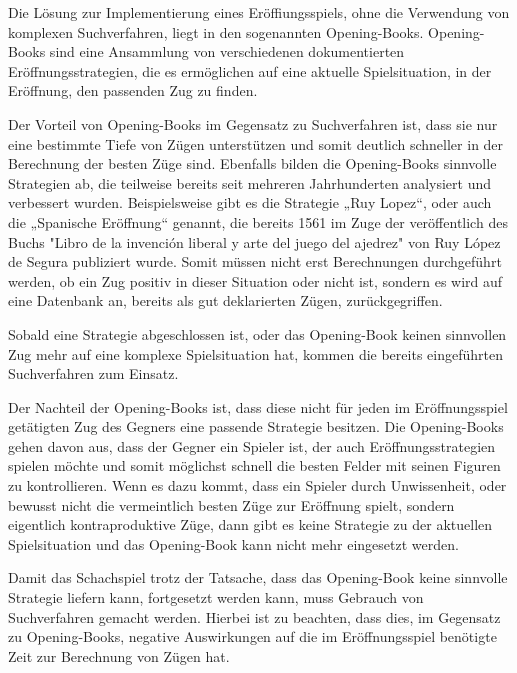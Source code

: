 
Die Lösung zur Implementierung eines Eröffiungsspiels, ohne die Verwendung von komplexen Suchverfahren, liegt in den sogenannten Opening-Books. Opening-Books sind eine Ansammlung von verschiedenen dokumentierten Eröffnungsstrategien, die es ermöglichen auf eine aktuelle Spielsituation, in der Eröffnung, den passenden Zug zu finden.

Der Vorteil von Opening-Books im Gegensatz zu Suchverfahren ist, dass sie nur eine bestimmte Tiefe von Zügen unterstützen und somit deutlich schneller in der Berechnung der besten Züge sind. Ebenfalls bilden die Opening-Books sinnvolle Strategien ab, die teilweise bereits seit mehreren Jahrhunderten analysiert und verbessert wurden. Beispielsweise gibt es die Strategie „Ruy Lopez“, oder auch die „Spanische Eröffnung“ genannt, die bereits 1561 im Zuge der veröffentlich des Buchs "Libro de la invención liberal y arte del juego del ajedrez" von Ruy López de Segura publiziert wurde. Somit müssen nicht erst Berechnungen durchgeführt werden, ob ein Zug positiv in dieser Situation oder nicht ist, sondern es wird auf eine Datenbank an, bereits als gut deklarierten Zügen, zurückgegriffen. 


Sobald eine Strategie abgeschlossen ist, oder das Opening-Book keinen sinnvollen Zug mehr auf eine komplexe Spielsituation hat, kommen die bereits eingeführten Suchverfahren zum Einsatz.

Der Nachteil der Opening-Books ist, dass diese nicht für jeden im Eröffnungsspiel getätigten Zug des Gegners eine passende Strategie besitzen. Die Opening-Books gehen davon aus, dass der Gegner ein Spieler ist, der auch Eröffnungsstrategien spielen möchte und somit möglichst schnell die besten Felder mit seinen Figuren zu kontrollieren. Wenn es dazu kommt, dass ein Spieler durch Unwissenheit, oder bewusst nicht die vermeintlich besten Züge zur Eröffnung spielt, sondern eigentlich kontraproduktive Züge, dann gibt es keine Strategie zu der aktuellen Spielsituation und das Opening-Book kann nicht mehr eingesetzt werden. 

Damit das Schachspiel trotz der Tatsache, dass das Opening-Book keine sinnvolle Strategie liefern kann, fortgesetzt werden kann, muss Gebrauch von Suchverfahren gemacht werden. Hierbei ist zu beachten, dass dies, im Gegensatz zu Opening-Books, negative Auswirkungen auf die im Eröffnungsspiel benötigte Zeit zur Berechnung von Zügen hat.


